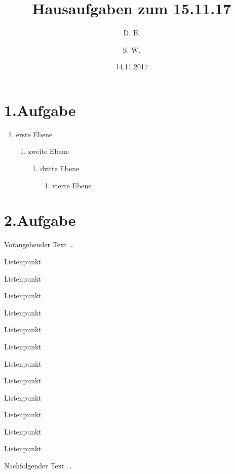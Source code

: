 \documentclass[12pt,a4paper]{article}
\title{Hausaufgaben zum 15.11.17}
\author{D. B. \and S. W.}
\date{14.11.2017}
\begin{document}
    
\maketitle
\section{1.Aufgabe}
    
\begin{enumerate}
  \item erste Ebene
    
  \begin{enumerate}
    \item zweite Ebene
    
      \begin{enumerate}
        \item dritte Ebene
        
          \begin{enumerate}
            \item vierte Ebene
            
\end{enumerate}
   \end{enumerate}
       \end{enumerate}
           \end{enumerate}
           
\section{2.Aufgabe}

\setlength{\plitemsep}{1pt}
\setlength{\pltopsep}{1ex}
    
Vorangehender Text \dots 

\begin{compactenum}[I]
	\item Listenpunkt
	\item Listenpunkt
	\item Listenpunkt
	\item Listenpunkt
	\item Listenpunkt
	\item Listenpunkt
	\item Listenpunkt
	\item Listenpunkt
	\item Listenpunkt
	\item Listenpunkt
	\item Listenpunkt
	\item Listenpunkt
\end{compactenum} 
Nachfolgender Text \dots     
\end{document}

